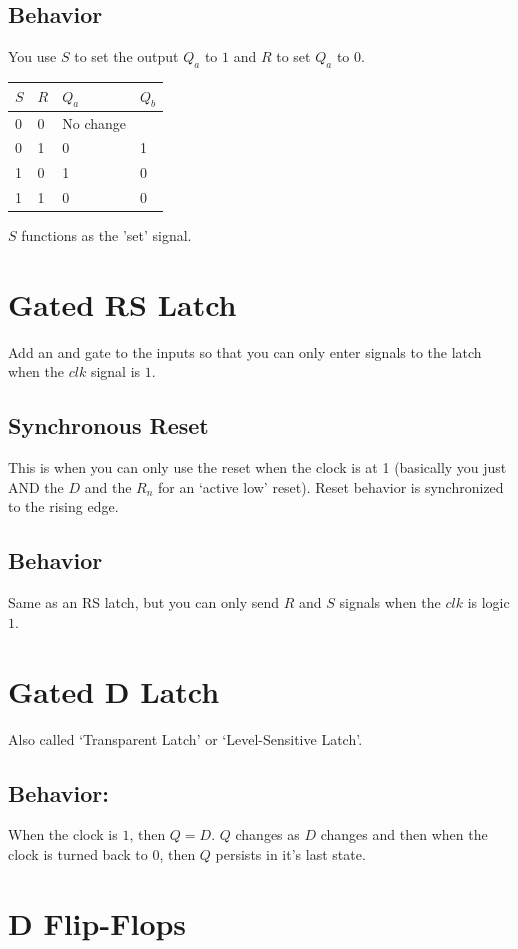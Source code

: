 \documentclass[a4paper,12pt]{report}
\begin{document}
\subsection{Behavior} 
You use $S$ to set the output $Q_a$ to $1$ and $R$ to set $Q_a$ to $0$.

\begin{tabular}{ll|ll}
$S$ & $R$ & $Q_a$ & $Q_b$ \\
\hline
0 & 0 & No change &  \\
0 & 1 & 0 & 1 \\
1 & 0 & 1 & 0 \\
1 & 1 & 0 & 0 \\
\end{tabular}

$S$ functions as the 'set' signal. 


\section{Gated RS Latch}
Add an and gate to the inputs so that you can only enter signals to the latch when 
the $clk$ signal is $1$.

\subsection{Synchronous Reset}
This is when you can only use the reset when the clock is at 1 (basically you just 
AND the $D$ and the $R_n$ for an `active low' reset). Reset behavior is synchronized to the rising edge. 

\subsection{Behavior} 
Same as an RS latch, but you can only send $R$ and $S$ signals when the $clk$ is logic $1$.

\section{Gated D Latch}
Also called `Transparent Latch' or `Level-Sensitive Latch'. 

\subsection{Behavior: } When the clock is $1$, then $Q = D$. $Q$ changes as $D$ changes 
and then when the clock is turned back to $0$, then $Q$ persists in it's last state. 

\section{D Flip-Flops}
\end{document}
